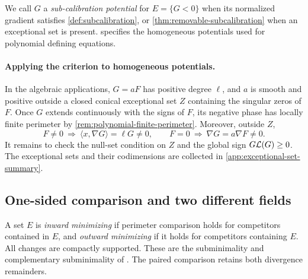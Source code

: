 We call \(G\) a \emph{sub-calibration potential} for \(E=\{G<0\}\)
when its normalized gradient satisfies \cref{def:subcalibration}, or
\cref{thm:removable-subcalibration} when an exceptional set is present.
 specifies the homogeneous
potentials used for polynomial defining equations.

\paragraph{Applying the criterion to homogeneous potentials.}
In the algebraic applications, \(G=aF\) has positive degree
\(\ell\), and \(a\) is smooth and positive outside a closed conical
exceptional set \(Z\) containing the singular zeros of \(F\).
Once \(G\) extends continuously with the signs of \(F\), its negative
phase has locally finite perimeter by
\cref{rem:polynomial-finite-perimeter}. Moreover, outside \(Z\),
\[
 F\neq0\ \Longrightarrow\
 \langle x,\nabla G\rangle=\ell G\neq0,
 \qquad
 F=0\ \Longrightarrow\ \nabla G=a\nabla F\neq0.
\]
It remains to check the null-set condition on \(Z\) and the global
sign \(G\mathcal L(G)\geq0\). The exceptional sets and their codimensions
are collected in \cref{app:exceptional-set-summary}.

\subsection*{One-sided comparison and two different fields}

A set \(E\) is \emph{inward minimizing} if perimeter comparison holds
for competitors contained in \(E\), and \emph{outward minimizing} if
it holds for competitors containing \(E\).  All changes are compactly
supported. These are the subminimality and complementary subminimality
of \cite[Definition~1.1]{DePhilippisPaolini}. The paired comparison
retains both divergence remainders.

